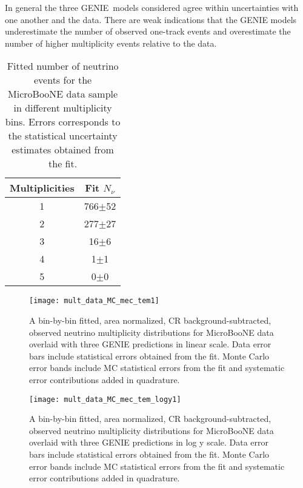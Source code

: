 \documentclass{article}
\begin{document}
In general the three GENIE\ models considered agree within uncertainties
with one another and the data. There are weak indications that the GENIE
models underestimate the number of observed one-track events and
overestimate the number of higher multiplicity events relative to the data.

\begin{table}[tbp]
\caption{Fitted number of neutrino events for the MicroBooNE data sample in
different multiplicity bins. Errors corresponds to the statistical uncertainty estimates obtained from the fit. }
\begin{center}
\begin{tabular}{c|c}
\textbf{Multiplicities} & \textbf{Fit $N_\nu$} \\ \hline
1 & 766$\pm$52 \\ 
2 & 277$\pm$27 \\ 
3 & 16$\pm$6 \\ 
4 & 1$\pm$1 \\ 
5 & 0$\pm$0 \\ 
 
\end{tabular}
\end{center}
\label{tab:mult_fit_data}
\end{table}

\begin{figure}[tbp]
\centering
\texttt{[image: mult\_data\_MC\_mec\_tem1]} %
\caption{A bin-by-bin fitted, area normalized, CR
background-subtracted, observed neutrino multiplicity distributions for MicroBooNE data overlaid with three GENIE predictions in linear scale. Data error bars include statistical errors
obtained from the fit. Monte Carlo error bands include MC statistical errors from the
fit and systematic error contributions added in quadrature. }
\label{img:final_mult_dist}
\end{figure}

\begin{figure}[tbp]
\centering
\texttt{[image: mult\_data\_MC\_mec\_tem\_logy1]} %
\caption{A bin-by-bin fitted, area normalized, CR
background-subtracted, observed neutrino multiplicity distributions for MicroBooNE data overlaid with three GENIE predictions in log y scale. Data error bars include statistical errors
obtained from the fit. Monte Carlo error bands include MC statistical errors from the
fit and systematic error contributions added in quadrature. }
\label{img:final_mult_dist_logy}
\end{figure}
\end{document}
